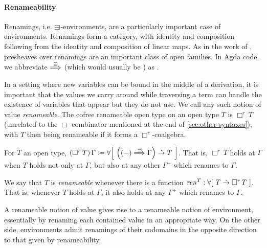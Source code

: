 \paragraph{Renameability}
Renamings, i.e. $\sqni$-environments, are a particularly important case of
environments.
Renamings form a category, with identity and composition following from the
identity and composition of linear maps.
As in the work of \citet{FPT99}, presheaves over renamings are an important
class of open families.
In Agda code, we abbreviate $\env\sqni$ (which would usually be
\AgdaOperator{\AgdaRecord{[}}\AgdaSpace{}%
\AgdaOperator{\AgdaRecord{\AgdaUnderscore{}$\sqni$\AgdaUnderscore{}}}\AgdaSpace{}%
\AgdaOperator{\AgdaRecord{]\AgdaUnderscore{}$\Rightarrow^e$\AgdaUnderscore{}}}%
) as .

In a setting where new variables can be bound in the middle of a derivation,
it is important that the values we carry around while traversing a term can
handle the existence of variables that appear but they do not use.
We call any such notion of value \emph{renameable}.
The cofree renameable open type on an open type $T$ is $\Box^r\,T$ (unrelated to
the $\Box$ combinator mentioned at the end of \cref{sec:other-syntaxes}), with
$T$ then being renameable if it forms a $\Box^r$-coalgebra.

\begin{definition}\label{def:box-r}
  For $T$ an open type,
  $\plr{\Box^r\,T}\,\Gamma \coloneqq
    \forallb{\plr{\plr{-} \env{\sqni} \Gamma} \dotto T}$.
  That is, $\Box^r\,T$ holds at $\Gamma$ when $T$ holds not only at $\Gamma$,
  but also at any other $\Gamma^+$ which renames to $\Gamma$.
\end{definition}
\begin{definition}\label{def:renameable}
  We say that $T$ is \emph{renameable} whenever there is a function
  $\mathit{ren}^T : \forallb{T \dotto \Box^r\,T}$.
  That is, whenever $T$ holds at $\Gamma$, it also holds at any $\Gamma^+$ which
  renames to $\Gamma$.
\end{definition}

A renameable notion of value gives rise to a renameable notion of environment,
essentially by renaming each contained value in an appropriate way.
On the other side, environments admit renamings of their codomains in the
opposite direction to that given by renameability.

